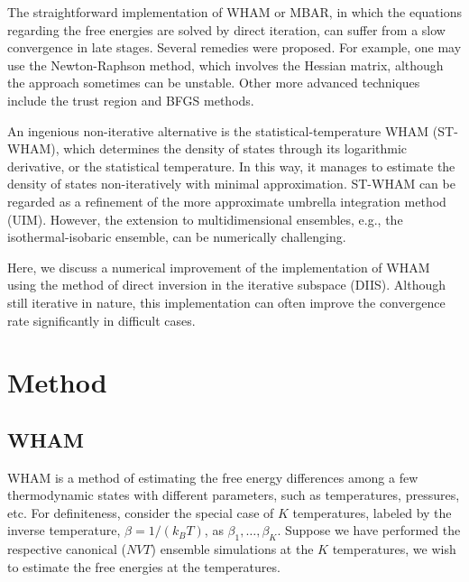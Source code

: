 \documentclass[reprint,aip,jcp,superscriptaddress]{revtex4-1}
\begin{document}
The straightforward implementation of WHAM or MBAR,
in which the equations regarding the free energies
are solved by direct iteration,
can suffer from
a slow convergence in late stages.
%
Several remedies were proposed\cite{
shirts2008, bereau2009, kim2011}.
%
For example, one may use the Newton-Raphson method,
which involves the Hessian matrix,
although the approach sometimes can be unstable\cite{
shirts2008}.
%
Other more advanced techniques include
the trust region and BFGS methods\cite{zhu2012}.



An ingenious non-iterative alternative is
the statistical-temperature WHAM (ST-WHAM)\cite{
kim2011}, which
determines the density of states
through its logarithmic derivative,
or the statistical temperature.
%
In this way,
it manages to estimate
the density of states non-iteratively
with minimal approximation.
%
ST-WHAM can be regarded as a refinement of
the more approximate umbrella integration method (UIM)\cite{
kastner2005, *kastner2009}.
%
However, the extension to multidimensional ensembles,
e.g., the isothermal-isobaric ensemble,
can be numerically challenging\cite{kim2011}.



Here, we discuss a numerical improvement of
the implementation of WHAM using
the method of direct inversion in the iterative subspace (DIIS)\cite{
pulay1980, *pulay1982, *hamilton1986,
kovalenko1999, howard2011}.
%
Although still iterative in nature,
this implementation
can often improve
the convergence rate
significantly in difficult cases.





\section{Method}





\subsection{WHAM}



WHAM is a method of
estimating the free energy differences
among a few thermodynamic states
with different parameters,
such as temperatures, pressures, etc.
%
For definiteness,
consider the special case of $K$ temperatures,
labeled by the inverse temperature,
$\beta = 1/(k_B T)$,
as
$\beta_1, \ldots, \beta_K$.
%
Suppose we have performed the respective
canonical ($NVT$) ensemble simulations
at the $K$ temperatures,
we wish to estimate the free energies
at the temperatures.
\end{document}
